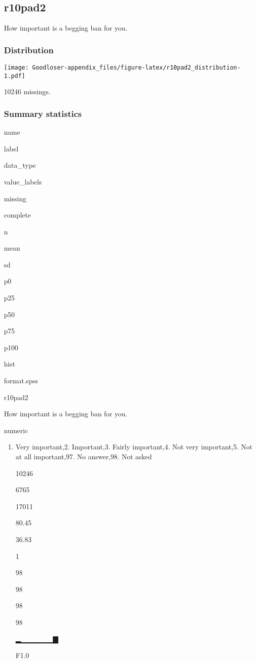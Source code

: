 \documentclass[]{book}
\providecommand{\tightlist}{%
  \setlength{\itemsep}{0pt}\setlength{\parskip}{0pt}}
\begin{document}
\subsection{r10pad2}\label{r10pad2}

How important is a begging ban for you.

\subsubsection{Distribution}\label{r10pad2_distribution}

\texttt{[image: Goodloser-appendix\_files/figure-latex/r10pad2\_distribution-1.pdf]}

10246 missings.

\subsubsection{Summary statistics}\label{r10pad2_summary}

name

label

data\_type

value\_labels

missing

complete

n

mean

sd

p0

p25

p50

p75

p100

hist

format.spss

r10pad2

How important is a begging ban for you.

numeric

\begin{enumerate}
\def\labelenumi{\arabic{enumi}.}
\tightlist
\item
  Very important,2. Important,3. Fairly important,4. Not very
  important,5. Not at all important,97. No answer,98. Not asked

  10246

  6765

  17011

  80.45

  36.83

  1

  98

  98

  98

  98

  ▂▁▁▁▁▁▁▇

  F1.0
\end{enumerate}
\end{document}
